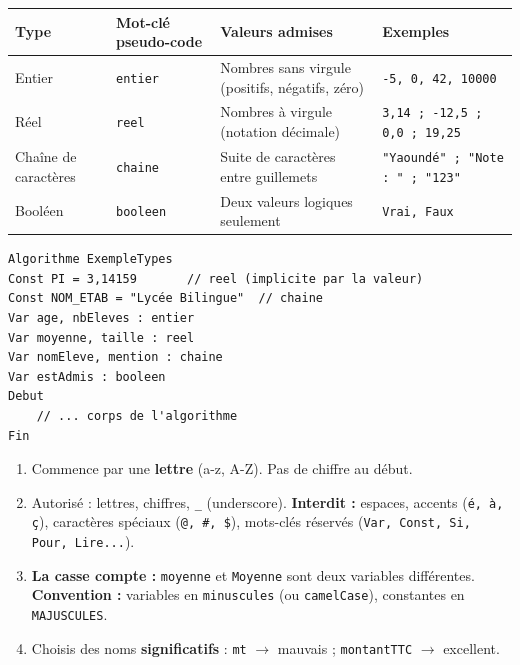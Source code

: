 \documentclass[11pt]{article}
\begin{document}
\begin{propriete}
\begin{center}
\begin{tabularx}{\linewidth}{|l|X|X|X|}
\hline
\rowcolor{popblueL} \textbf{Type} & \textbf{Mot-clé pseudo-code} & \textbf{Valeurs admises} & \textbf{Exemples} \\
\hline
Entier & \texttt{entier} & Nombres sans virgule (positifs, négatifs, zéro) & \texttt{-5, 0, 42, 10000} \\
\hline
Réel & \texttt{reel} & Nombres à virgule (notation décimale) & \texttt{3,14 ; -12,5 ; 0,0 ; 19,25} \\
\hline
Chaîne de caractères & \texttt{chaine} & Suite de caractères entre guillemets & \texttt{"Yaoundé" ; "Note : " ; "123"} \\
\hline
Booléen & \texttt{booleen} & Deux valeurs logiques seulement & \texttt{Vrai, Faux} \\
\hline
\end{tabularx}
\end{center}
\end{propriete}

\begin{exemplebox}
\begin{lstlisting}
Algorithme ExempleTypes
Const PI = 3,14159       // reel (implicite par la valeur)
Const NOM_ETAB = "Lycée Bilingue"  // chaine
Var age, nbEleves : entier
Var moyenne, taille : reel
Var nomEleve, mention : chaine
Var estAdmis : booleen
Debut
    // ... corps de l'algorithme
Fin
\end{lstlisting}
\end{exemplebox}

\begin{attention}
\begin{enumerate}
\item Commence par une \textbf{lettre} (a-z, A-Z). Pas de chiffre au début.
\item Autorisé : lettres, chiffres, \texttt{\_} (underscore). \textbf{Interdit :} espaces, accents (\texttt{é, à, ç}), caractères spéciaux (\texttt{@, \#, \$}), mots-clés réservés (\texttt{Var, Const, Si, Pour, Lire...}).
\item \textbf{La casse compte :} \texttt{moyenne} et \texttt{Moyenne} sont deux variables différentes. \textbf{Convention :} variables en \texttt{minuscules} (ou \texttt{camelCase}), constantes en \texttt{MAJUSCULES}.
\item Choisis des noms \textbf{significatifs} : \texttt{mt} $\rightarrow$ mauvais ; \texttt{montantTTC} $\rightarrow$ excellent.
\end{enumerate}
\end{attention}
\end{document}
